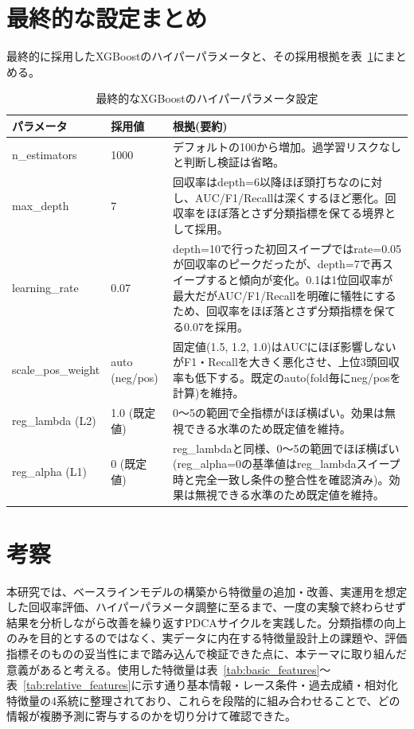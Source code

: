 \documentclass[dvipdfmx, a4paper, 11pt, titlepage]{jsarticle}
\begin{document}
\section{最終的な設定まとめ}

最終的に採用したXGBoostのハイパーパラメータと、その採用根拠を表~\ref{tab:final_params}にまとめる。

\begin{table}[H]
\centering
\caption{最終的なXGBoostのハイパーパラメータ設定}
\label{tab:final_params}
\begin{tabular}{p{3cm}p{2.5cm}p{8.5cm}}
\toprule
パラメータ & 採用値 & 根拠(要約) \\
\midrule
n\_estimators & 1000 & デフォルトの100から増加。過学習リスクなしと判断し検証は省略。 \\
\addlinespace
max\_depth & 7 & 回収率はdepth=6以降ほぼ頭打ちなのに対し、AUC/F1/Recallは深くするほど悪化。回収率をほぼ落とさず分類指標を保てる境界として採用。 \\
\addlinespace
learning\_rate & 0.07 & depth=10で行った初回スイープではrate=0.05が回収率のピークだったが、depth=7で再スイープすると傾向が変化。0.1は1位回収率が最大だがAUC/F1/Recallを明確に犠牲にするため、回収率をほぼ落とさず分類指標を保てる0.07を採用。 \\
\addlinespace
scale\_pos\_weight & auto (neg/pos) & 固定値(1.5, 1.2, 1.0)はAUCにほぼ影響しないがF1・Recallを大きく悪化させ、上位3頭回収率も低下する。既定のauto(fold毎にneg/posを計算)を維持。 \\
\addlinespace
reg\_lambda (L2) & 1.0 (既定値) & 0〜5の範囲で全指標がほぼ横ばい。効果は無視できる水準のため既定値を維持。 \\
\addlinespace
reg\_alpha (L1) & 0 (既定値) & reg\_lambdaと同様、0〜5の範囲でほぼ横ばい(reg\_alpha=0の基準値はreg\_lambdaスイープ時と完全一致し条件の整合性を確認済み)。効果は無視できる水準のため既定値を維持。 \\
\bottomrule
\end{tabular}
\end{table}

\section{考察}

本研究では、ベースラインモデルの構築から特徴量の追加・改善、実運用を想定した回収率評価、ハイパーパラメータ調整に至るまで、一度の実験で終わらせず結果を分析しながら改善を繰り返すPDCAサイクルを実践した。分類指標の向上のみを目的とするのではなく、実データに内在する特徴量設計上の課題や、評価指標そのものの妥当性にまで踏み込んで検証できた点に、本テーマに取り組んだ意義があると考える。使用した特徴量は表~\ref{tab:basic_features}〜表~\ref{tab:relative_features}に示す通り基本情報・レース条件・過去成績・相対化特徴量の4系統に整理されており、これらを段階的に組み合わせることで、どの情報が複勝予測に寄与するのかを切り分けて確認できた。
\end{document}
